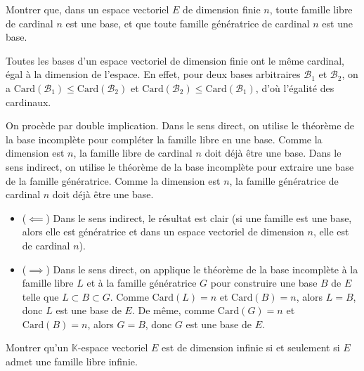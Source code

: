 \documentclass[11pt, a4paper]{article}
\theoremstyle{definition}
\begin{document}
\clearpage

\begin{tcolorbox}[instructionstyle]
	Montrer que, dans un espace vectoriel $E$ de dimension finie $n$, toute famille libre de cardinal $n$ est une base, et que toute famille génératrice de cardinal $n$ est une base.
\end{tcolorbox}

\begin{rappel}
	Toutes les bases d'un espace vectoriel de dimension finie ont le même cardinal, égal à la dimension de l'espace. En effet, pour deux bases arbitraires $\mathcal{B}_1$ et $\mathcal{B}_2$, on a $\mathrm{Card}(\mathcal{B}_1) \le \mathrm{Card}(\mathcal{B}_2)$ et $\mathrm{Card}(\mathcal{B}_2) \le \mathrm{Card}(\mathcal{B}_1)$, d'où l'égalité des cardinaux.
\end{rappel}

\begin{tcolorbox}[methodstyle]
	On procède par double implication. Dans le sens direct, on utilise le théorème de la base incomplète pour compléter la famille libre en une base. Comme la dimension est $n$, la famille libre de cardinal $n$ doit déjà être une base. Dans le sens indirect, on utilise le théorème de la base incomplète pour extraire une base de la famille génératrice. Comme la dimension est $n$, la famille génératrice de cardinal $n$ doit déjà être une base.
\end{tcolorbox}

\begin{itemize}
	\item ($\impliedby$) Dans le sens indirect, le résultat est clair (si une famille est une base, alors elle est génératrice et dans un espace vectoriel de dimension $n$, elle est de cardinal $n$).
	\item ($\implies$) Dans le sens direct, on applique le théorème de la base incomplète à la famille libre $L$ et à la famille génératrice $G$ pour construire une base $B$ de $E$ telle que $L \subset B \subset G$. Comme $\mathrm{Card}(L) = n$ et $\mathrm{Card}(B) = n$, alors $L = B$, donc $L$ est une base de $E$. De même, comme $\mathrm{Card}(G) = n$ et $\mathrm{Card}(B) = n$, alors $G = B$, donc $G$ est une base de $E$.
\end{itemize}

\clearpage

\begin{tcolorbox}[instructionstyle]
	Montrer qu'un $\mathbb K$-espace vectoriel $E$ est de dimension infinie si et seulement si $E$ admet une famille libre infinie.
\end{tcolorbox}
\end{document}
